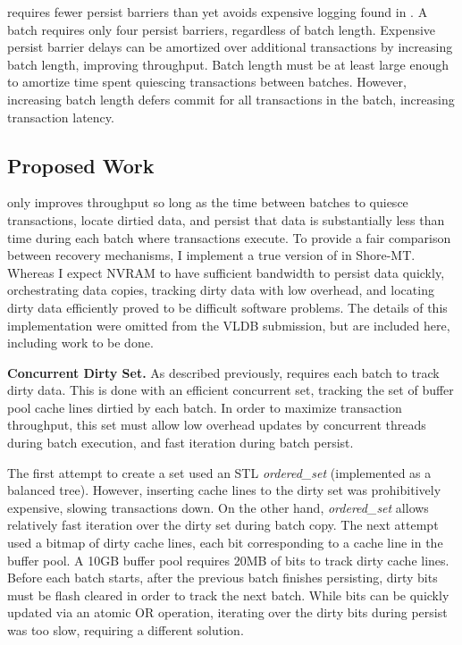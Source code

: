 \GroupCommit requires fewer persist barriers than \InPlace yet avoids expensive logging found in \NVDisk.
A batch requires only four persist barriers, regardless of batch length.
Expensive persist barrier delays can be amortized over additional transactions by increasing batch length, improving throughput.
Batch length must be at least large enough to amortize time spent quiescing transactions between batches.
However, increasing batch length defers commit for all transactions in the batch, increasing transaction latency.

\subsection{Proposed Work}
\label{sec::OLTP_design:GroupCommit:Proposed}

\GroupCommit only improves throughput so long as the time between batches to quiesce transactions, locate dirtied data, and persist that data is substantially less than time during each batch where transactions execute.
To provide a fair comparison between recovery mechanisms, I implement a true version of \GroupCommit in Shore-MT.
Whereas I expect NVRAM to have sufficient bandwidth to persist data quickly, orchestrating data copies, tracking dirty data with low overhead, and locating dirty data efficiently proved to be difficult software problems.
The details of this implementation were omitted from the VLDB submission, but are included here, including work to be done.

\textbf{Concurrent Dirty Set.}
As described previously, \GroupCommit requires each batch to track dirty data.
This is done with an efficient concurrent set, tracking the set of buffer pool cache lines dirtied by each batch.
In order to maximize transaction throughput, this set must allow low overhead updates by concurrent threads during batch execution, and fast iteration during batch persist.

The first attempt to create a set used an STL \emph{ordered\_set} (implemented as a balanced tree).
However, inserting cache lines to the dirty set was prohibitively expensive, slowing transactions down.
On the other hand, \emph{ordered\_set} allows relatively fast iteration over the dirty set during batch copy.
The next attempt used a bitmap of dirty cache lines, each bit corresponding to a cache line in the buffer pool.
A 10GB buffer pool requires 20MB of bits to track dirty cache lines.
Before each batch starts, after the previous batch finishes persisting, dirty bits must be flash cleared in order to track the next batch.
While bits can be quickly updated via an atomic OR operation, iterating over the dirty bits during persist was too slow, requiring a different solution.

